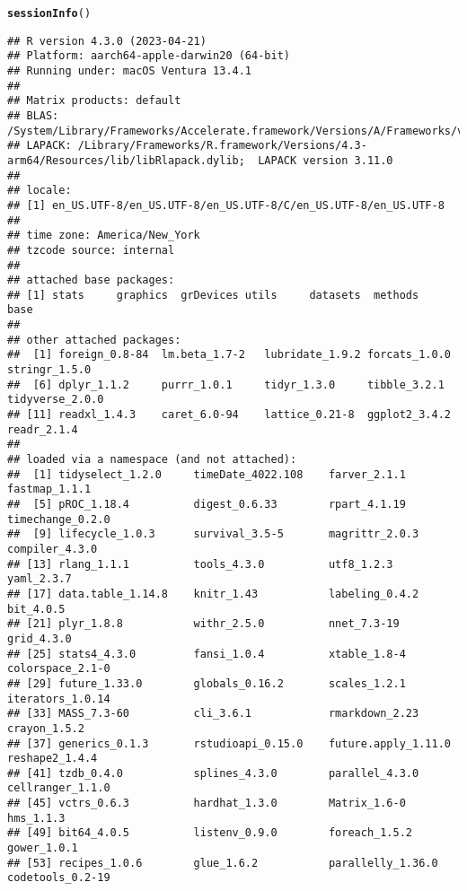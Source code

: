 \documentclass{article}\usepackage[]{graphicx}\usepackage[]{xcolor}
\makeatletter
\newcommand{\hlstd}[1]{\textcolor[rgb]{0.345,0.345,0.345}{#1}}%
\newcommand{\hlkwd}[1]{\textcolor[rgb]{0.737,0.353,0.396}{\textbf{#1}}}%
\newenvironment{kframe}{%
 \def\at@end@of@kframe{}%
 \ifinner\ifhmode%
  \def\at@end@of@kframe{\end{minipage}}%
  \begin{minipage}{\columnwidth}%
 \fi\fi%
 \def\FrameCommand##1{\hskip\@totalleftmargin \hskip-\fboxsep
 \colorbox{shadecolor}{##1}\hskip-\fboxsep
     \hskip-\linewidth \hskip-\@totalleftmargin \hskip\columnwidth}%
 \MakeFramed {\advance\hsize-\width
   \@totalleftmargin\z@ \linewidth\hsize
   \@setminipage}}%
 {\par\unskip\endMakeFramed%
 \at@end@of@kframe}
\newenvironment{knitrout}{}{} %
\makeatother
\begin{document}
\begin{knitrout}
\color{fgcolor}\begin{kframe}
\begin{alltt}
\hlkwd{sessionInfo}\hlstd{()}
\end{alltt}
\begin{verbatim}
## R version 4.3.0 (2023-04-21)
## Platform: aarch64-apple-darwin20 (64-bit)
## Running under: macOS Ventura 13.4.1
## 
## Matrix products: default
## BLAS:   /System/Library/Frameworks/Accelerate.framework/Versions/A/Frameworks/vecLib.framework/Versions/A/libBLAS.dylib 
## LAPACK: /Library/Frameworks/R.framework/Versions/4.3-arm64/Resources/lib/libRlapack.dylib;  LAPACK version 3.11.0
## 
## locale:
## [1] en_US.UTF-8/en_US.UTF-8/en_US.UTF-8/C/en_US.UTF-8/en_US.UTF-8
## 
## time zone: America/New_York
## tzcode source: internal
## 
## attached base packages:
## [1] stats     graphics  grDevices utils     datasets  methods   base     
## 
## other attached packages:
##  [1] foreign_0.8-84  lm.beta_1.7-2   lubridate_1.9.2 forcats_1.0.0   stringr_1.5.0  
##  [6] dplyr_1.1.2     purrr_1.0.1     tidyr_1.3.0     tibble_3.2.1    tidyverse_2.0.0
## [11] readxl_1.4.3    caret_6.0-94    lattice_0.21-8  ggplot2_3.4.2   readr_2.1.4    
## 
## loaded via a namespace (and not attached):
##  [1] tidyselect_1.2.0     timeDate_4022.108    farver_2.1.1         fastmap_1.1.1       
##  [5] pROC_1.18.4          digest_0.6.33        rpart_4.1.19         timechange_0.2.0    
##  [9] lifecycle_1.0.3      survival_3.5-5       magrittr_2.0.3       compiler_4.3.0      
## [13] rlang_1.1.1          tools_4.3.0          utf8_1.2.3           yaml_2.3.7          
## [17] data.table_1.14.8    knitr_1.43           labeling_0.4.2       bit_4.0.5           
## [21] plyr_1.8.8           withr_2.5.0          nnet_7.3-19          grid_4.3.0          
## [25] stats4_4.3.0         fansi_1.0.4          xtable_1.8-4         colorspace_2.1-0    
## [29] future_1.33.0        globals_0.16.2       scales_1.2.1         iterators_1.0.14    
## [33] MASS_7.3-60          cli_3.6.1            rmarkdown_2.23       crayon_1.5.2        
## [37] generics_0.1.3       rstudioapi_0.15.0    future.apply_1.11.0  reshape2_1.4.4      
## [41] tzdb_0.4.0           splines_4.3.0        parallel_4.3.0       cellranger_1.1.0    
## [45] vctrs_0.6.3          hardhat_1.3.0        Matrix_1.6-0         hms_1.1.3           
## [49] bit64_4.0.5          listenv_0.9.0        foreach_1.5.2        gower_1.0.1         
## [53] recipes_1.0.6        glue_1.6.2           parallelly_1.36.0    codetools_0.2-19    

\end{verbatim}
\end{kframe}
\end{knitrout}
\end{document}
